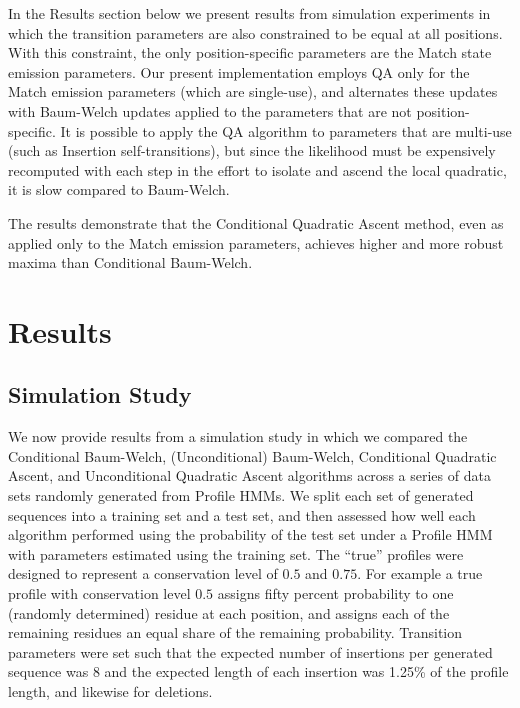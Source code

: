 \documentclass[preprint,12pt,authoryear]{elsarticle}
\begin{document}
In the Results section below we present results from simulation
experiments in which the transition parameters are also constrained to be
equal at all positions.  With this constraint, the only
position-specific parameters are the Match state emission parameters.
Our present implementation employs QA only for the Match emission
parameters (which are single-use), and alternates these updates with
Baum-Welch updates applied to the parameters that are not
position-specific.  It is possible to apply the QA algorithm to
parameters that are multi-use (such as Insertion self-transitions), but
since the likelihood must be expensively recomputed with each step in
the effort to isolate and ascend the local quadratic, it is slow compared to Baum-Welch.

The results demonstrate that the Conditional Quadratic Ascent method,
even as applied only to the Match emission parameters, achieves higher
and more robust maxima than Conditional Baum-Welch.

\section{Results}
\subsection{Simulation Study}
We now provide results from a simulation study in which we compared
the Conditional Baum-Welch, (Unconditional) Baum-Welch, Conditional
Quadratic Ascent, and Unconditional Quadratic Ascent algorithms across
a series of data sets randomly generated from Profile HMMs.  We split
each set of generated sequences into a training set and a test set,
and then assessed how well each algorithm performed using the
probability of the test set under a Profile HMM with parameters
estimated using the training set.  The ``true'' profiles were designed
to represent a conservation level of $0.5$ and $0.75$.  For
example a true profile with conservation level $0.5$ assigns fifty
percent probability to one (randomly determined) residue at each
position, and assigns each of the remaining residues an equal share of
the remaining probability.  Transition parameters were set such that
the expected number of insertions per generated sequence was $8$ and the
expected length of each insertion was 1.25\% of the profile length,
and likewise for deletions.
\end{document}
